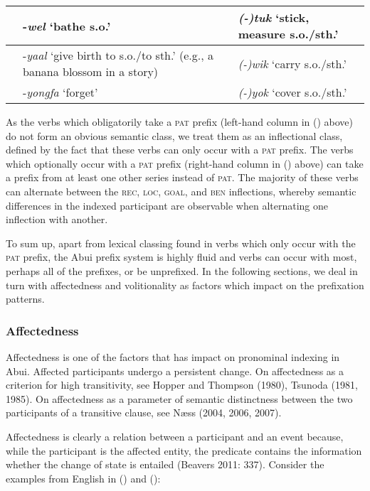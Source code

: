 \begin{flushleft}
\begin{supertabular}{|m{0.6011598in}|m{2.7900598in}|m{2.79136in}|}
 &
{}-\textit{wel} {\textquoteleft}bathe s.o.{\textquoteright} &
\textit{(-)}\textit{tuk }{\textquoteleft}stick, measure s.o./sth.{\textquoteright}\\\hline
 &
{}-\textit{yaal} {\textquoteleft}give birth to s.o./to sth.{\textquoteright} (e.g., a banana blossom in a story) &
\textit{(-)}\textit{wik }{\textquoteleft}carry s.o./sth.{\textquoteright}\\\hline
 &
{}-\textit{yongfa} {\textquoteleft}forget{\textquoteright} &
\textit{(-)}\textit{yok }{\textquoteleft}cover s.o./sth.{\textquoteright}\\\hline
\end{supertabular}
\end{flushleft}
As the verbs which obligatorily take a \textsc{pat} prefix (left-hand column in () above) do not form an obvious semantic class, we treat them as an inflectional class, defined by the fact that these verbs can only occur with a \textsc{pat} prefix. The verbs which optionally occur with a \textsc{pat} prefix (right-hand column in () above) can take a prefix from at least one other series instead of \textsc{pat}. The majority of these verbs can alternate between the \textsc{rec}, \textsc{loc}, \textsc{goal}, and \textsc{ben} inflections, whereby semantic differences in the indexed participant are observable when alternating one inflection with another.

To sum up, apart from lexical classing found in verbs which only occur with the \textsc{pat} prefix, the Abui prefix system is highly fluid and verbs can occur with most, perhaps all of the prefixes, or be unprefixed. In the following sections, we deal in turn with affectedness and volitionality as factors which impact on the prefixation patterns.

\subsubsection[Affectedness]{\bfseries Affectedness}
Affectedness is one of the factors that has impact on pronominal indexing in Abui. Affected participants undergo a persistent change. On affectedness as a criterion for high transitivity, see Hopper and Thompson (1980), Tsunoda (1981, 1985). On affectedness as a parameter of semantic distinctness between the two participants of a transitive clause, see N{\ae}ss (2004, 2006, 2007).

Affectedness is clearly a relation between a participant and an event because, while the participant is the affected entity, the predicate contains the information whether the change of state is entailed (Beavers 2011: 337). Consider the examples from English in () and ():

